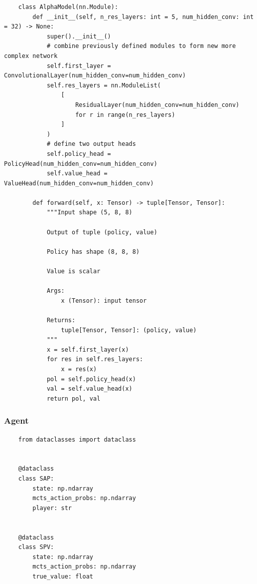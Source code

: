 \documentclass{article}
\makeatletter
\newcommand\subsubsubsection{\@startsection{paragraph}{4}{\z@}{-2.5ex\@plus -1ex \@minus -.25ex}{1.25ex \@plus .25ex}{\normalfont\normalsize\bfseries}}
\makeatother
\begin{document}
\begin{verbatim}
    class AlphaModel(nn.Module):
        def __init__(self, n_res_layers: int = 5, num_hidden_conv: int = 32) -> None:
            super().__init__()
            # combine previously defined modules to form new more complex network
            self.first_layer = ConvolutionalLayer(num_hidden_conv=num_hidden_conv)
            self.res_layers = nn.ModuleList(
                [
                    ResidualLayer(num_hidden_conv=num_hidden_conv)
                    for r in range(n_res_layers)
                ]
            )
            # define two output heads
            self.policy_head = PolicyHead(num_hidden_conv=num_hidden_conv)
            self.value_head = ValueHead(num_hidden_conv=num_hidden_conv)

        def forward(self, x: Tensor) -> tuple[Tensor, Tensor]:
            """Input shape (5, 8, 8)

            Output of tuple (policy, value)

            Policy has shape (8, 8, 8)

            Value is scalar

            Args:
                x (Tensor): input tensor

            Returns:
                tuple[Tensor, Tensor]: (policy, value)
            """
            x = self.first_layer(x)
            for res in self.res_layers:
                x = res(x)
            pol = self.policy_head(x)
            val = self.value_head(x)
            return pol, val
    \end{verbatim}

    \subsubsection{Agent}

    \subsubsubsection{Memory Types}
    \begin{verbatim}
    from dataclasses import dataclass


    @dataclass
    class SAP:
        state: np.ndarray
        mcts_action_probs: np.ndarray
        player: str


    @dataclass
    class SPV:
        state: np.ndarray
        mcts_action_probs: np.ndarray
        true_value: float
    \end{verbatim}
\end{document}
